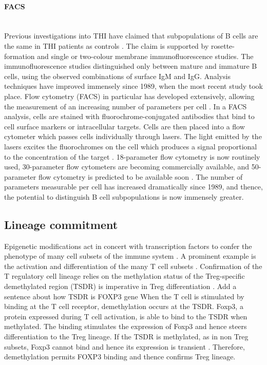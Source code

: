 \documentclass[12pt]{article}
\begin{document}
			
			
		\paragraph{FACS}
			~\\
			Previous investigations into THI have claimed that subpopulations of B cells are the same in THI patients as controls \citep{Tiller78,Stiemh80,Siegel81,Buckley83,Fiorilli86,Dressler89}. 
			The claim is supported by rosette-formation and single or two-colour membrane immunofluorescence studies. 
			The immunofluorescence studies distinguished only between mature and immature B cells, using the observed combinations of surface IgM and IgG. 
			Analysis techniques have improved immensely since 1989, when the most recent study took place.
			Flow cytometry (FACS) in particular has developed extensively, allowing the measurement of an increasing number of parameters per cell \citep{Saeys16}.
			In a FACS analysis, cells are stained with fluorochrome-conjugated antibodies that bind to cell surface markers or intracellular targets. 
			Cells are then placed into a flow cytometer which passes cells individually through lasers.
			The light emitted by the lasers excites the fluorochromes on the cell which produces a signal proportional to the concentration of the target \citep{Aghaeepour13}.
			18-parameter flow cytometry is now routinely used, 30-parameter flow cytometers are becoming commercially available, and 50-parameter flow cytometry is predicted to be available soon \citep{Saeys16}.
			The number of parameters measurable per cell has increased dramatically since 1989, and thence, the potential to distinguish B cell subpopulations is now immensely greater.

			
		\subsection{Lineage commitment}
			
			Epigenetic modifications act in concert with transcription factors to confer the phenotype of many cell subsets of the immune system \citep{Lara14,Zan15,Mercer11}. 
			A prominent example is the activation and differentiation of the many T cell subsets \citep{Begin14, Zeng13}. 
			Confirmation of the T regulatory cell lineage relies on the methylation status of the Treg-specific demethylated region (TSDR) is imperative in Treg differentiation \citep{Polansky08}.
			{\Large Add a sentence about how TSDR is FOXP3 gene}
			When the T cell is stimulated by binding at the T cell receptor, demethylation occurs at the TSDR.
			Foxp3, a protein expressed during T cell activation, is able to bind to the TSDR when methylated. 
			The binding stimulates the expression of Foxp3 and hence steers differentiation to the Treg lineage.
			If the TSDR is methylated, as in non Treg subsets, Foxp3 cannot bind and hence its expression is transient \citep{Ohkura13}. 
			Therefore, demethylation permits FOXP3 binding and thence confirms Treg lineage.
			
\end{document}

